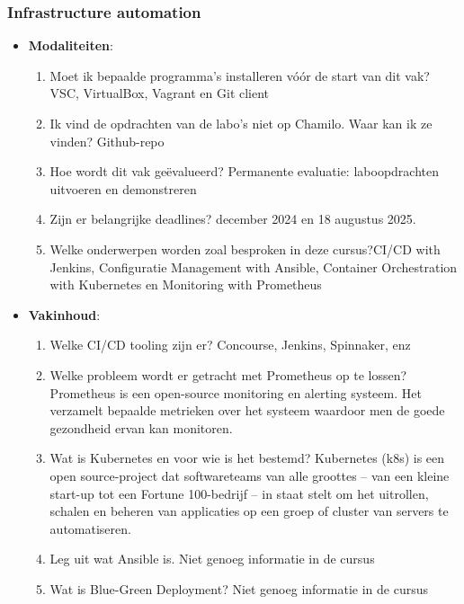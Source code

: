 \subsubsection{Infrastructure automation}

\begin{itemize}
    \item \textbf{Modaliteiten}: \begin{enumerate}
        \item Moet ik bepaalde programma’s installeren vóór de start van dit vak? \rightarrow VSC, VirtualBox, Vagrant en Git client 
        \item Ik vind de opdrachten van de labo's niet op Chamilo. Waar kan ik ze vinden? \rightarrow Github-repo
        \item Hoe wordt dit vak geëvalueerd? \rightarrow Permanente evaluatie: laboopdrachten uitvoeren en demonstreren
        \item Zijn er belangrijke deadlines?  december 2024 en 18 augustus 2025.
        \item Welke onderwerpen worden zoal besproken in deze cursus?\rightarrow CI/CD with Jenkins, Configuratie Management with Ansible, Container Orchestration with Kubernetes en Monitoring with Prometheus
    \end{enumerate}
    \item \textbf{Vakinhoud}: \begin{enumerate}
        \item Welke CI/CD tooling zijn er? \rightarrow Concourse, Jenkins, Spinnaker, enz
        \item Welke probleem wordt er getracht met Prometheus op te lossen? \rightarrow Prometheus is een open-source monitoring en alerting systeem. Het verzamelt bepaalde metrieken over het systeem waardoor men de goede gezondheid ervan kan monitoren.
        \item Wat is  Kubernetes en voor wie is het bestemd? \rightarrow Kubernetes (k8s) is een open source-project dat softwareteams van alle groottes – van een kleine start-up tot een Fortune 100-bedrijf – in staat stelt om het uitrollen, schalen en beheren van applicaties op een groep of cluster van servers te automatiseren.
        \item Leg uit wat Ansible is. \rightarrow Niet genoeg informatie in de cursus
        \item Wat is Blue-Green Deployment? \rightarrow Niet genoeg informatie in de cursus    
    \end{enumerate}
\end{itemize}

